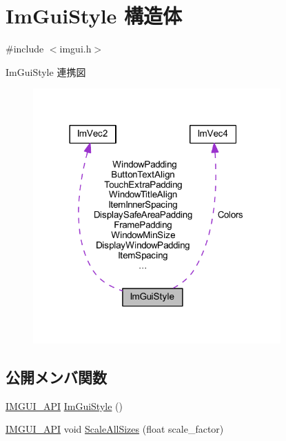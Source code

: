 \hypertarget{struct_im_gui_style}{}\section{Im\+Gui\+Style 構造体}
\label{struct_im_gui_style}


{\ttfamily \#include $<$imgui.\+h$>$}



Im\+Gui\+Style 連携図\nopagebreak
\begin{figure}[H]
\begin{center}
\leavevmode
\includegraphics[width=269pt]{struct_im_gui_style__coll__graph}
\end{center}
\end{figure}
\subsection*{公開メンバ関数}
\begin{DoxyCompactItemize}
\item 
\mbox{\hyperlink{imgui_8h_a43829975e84e45d1149597467a14bbf5}{I\+M\+G\+U\+I\+\_\+\+A\+PI}} \mbox{\hyperlink{struct_im_gui_style_ab0a3ffb3aeec3e6b09b9bde812b28369}{Im\+Gui\+Style}} ()
\item 
\mbox{\hyperlink{imgui_8h_a43829975e84e45d1149597467a14bbf5}{I\+M\+G\+U\+I\+\_\+\+A\+PI}} void \mbox{\hyperlink{struct_im_gui_style_a7c9d3e0974a239f65e433cc952be0627}{Scale\+All\+Sizes}} (float scale\+\_\+factor)
\end{DoxyCompactItemize}
